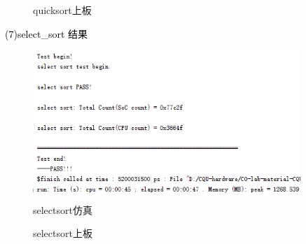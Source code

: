 \begin{figure}[htbp]
    \centering
    \caption{quicksort上板}
\end{figure}

\textcolor{black}{(7)select\_sort 结果}\\
\begin{figure}[htbp]
    \centering
    \includegraphics[width=0.9\textwidth]{image/selectsortS.png}
    \caption{selectsort仿真}
\end{figure}

\begin{figure}[htbp]
    \centering
    \caption{selectsort上板}
\end{figure}

